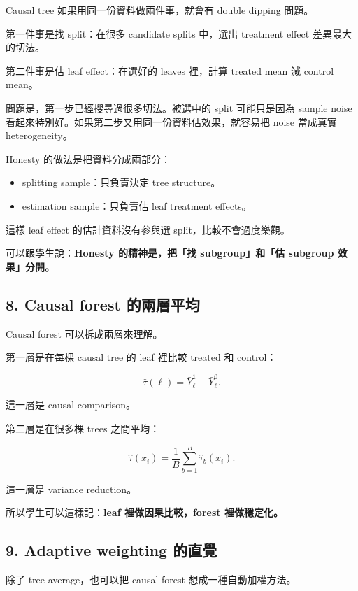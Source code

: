 \documentclass[
  chinese,
  11pt,
]{article}
\providecommand{\tightlist}{%
  \setlength{\itemsep}{0pt}\setlength{\parskip}{0pt}}
\begin{document}
Causal tree 如果用同一份資料做兩件事，就會有 double dipping 問題。

第一件事是找 split：在很多 candidate splits 中，選出 treatment effect
差異最大的切法。

第二件事是估 leaf effect：在選好的 leaves 裡，計算 treated mean 減
control mean。

問題是，第一步已經搜尋過很多切法。被選中的 split 可能只是因為 sample
noise 看起來特別好。如果第二步又用同一份資料估效果，就容易把 noise
當成真實 heterogeneity。

Honesty 的做法是把資料分成兩部分：

\begin{itemize}
\tightlist
\item
  splitting sample：只負責決定 tree structure。
\item
  estimation sample：只負責估 leaf treatment effects。
\end{itemize}

這樣 leaf effect 的估計資料沒有參與選 split，比較不會過度樂觀。

可以跟學生說：\textbf{Honesty 的精神是，把「找 subgroup」和「估 subgroup
效果」分開。}

\subsection{8. Causal forest
的兩層平均}\label{causal-forest-ux7684ux5169ux5c64ux5e73ux5747}

Causal forest 可以拆成兩層來理解。

第一層是在每棵 causal tree 的 leaf 裡比較 treated 和 control：

\[
\hat{\tau}(\ell)=\bar{Y}^{1}_{\ell}-\bar{Y}^{0}_{\ell}.
\]

這一層是 causal comparison。

第二層是在很多棵 trees 之間平均：

\[
\hat{\tau}(x_i)=
\frac{1}{B}\sum_{b=1}^{B}\hat{\tau}_b(x_i).
\]

這一層是 variance reduction。

所以學生可以這樣記：\textbf{leaf 裡做因果比較，forest 裡做穩定化。}

\subsection{9. Adaptive weighting
的直覺}\label{adaptive-weighting-ux7684ux76f4ux89ba}

除了 tree average，也可以把 causal forest 想成一種自動加權方法。
\end{document}
